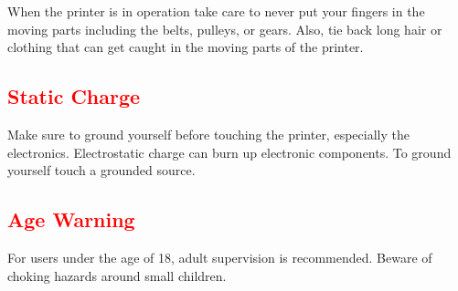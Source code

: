 When the printer is in operation take care to never put your fingers in the moving parts including the belts, pulleys, or gears. Also, tie back long hair or clothing that can get caught in the moving parts of the printer.

\subsection{\textcolor{red}{Static Charge}}
Make sure to ground yourself before touching the printer, especially the electronics. Electrostatic charge can burn up electronic components. To ground yourself touch a grounded source.

\subsection{\textcolor{red}{Age Warning}}

For users under the age of 18, adult supervision is recommended. Beware of choking hazards around small children.


